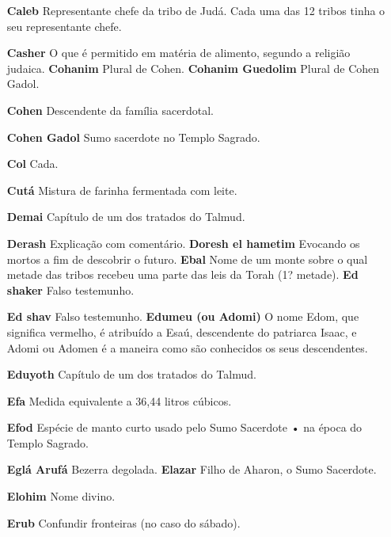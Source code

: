 \begin{itemize}
\item[\textbf{Caleb}] Representante chefe da tribo de Judá. Cada uma das 12
tribos tinha o seu representante chefe.

\item[\textbf{Casher}] O que é permitido em matéria de alimento, segundo a
religião judaica. \textbf{Cohanim} Plural de Cohen. \textbf{Cohanim
Guedolim} Plural de Co­hen Gadol.

\item[\textbf{Cohen}] Descendente da família sacer­dotal.

\item[\textbf{Cohen Gadol}] Sumo sacerdote no Templo Sagrado.

\item[\textbf{Col}] Cada.

\item[\textbf{Cutá}] Mistura de farinha fermentada com leite.

\item[\textbf{Demai}] Capítulo de um dos tratados do Talmud.

\item[\textbf{Derash}] Explicação com comentário. \textbf{Doresh el hametim} Evocando os mortos a fim de descobrir o futuro. \textbf{Ebal} Nome
de um monte sobre o qual metade das tribos recebeu uma parte das leis da
Torah (1? metade). \textbf{Ed shaker} Falso testemunho.

\item[\textbf{Ed shav} Falso testemunho. \textbf{Edumeu (ou Adomi)}] O nome
Edom, que significa vermelho, é atri­buído a Esaú, descendente do
patriar­ca Isaac, e Adomi ou Adomen é a ma­neira como são conhecidos os
seus descendentes.

\item[\textbf{Eduyoth}] Capítulo de um dos trata­dos do Talmud.

\item[\textbf{Efa}] Medida equivalente a 36,44 litros cúbicos.

\item[\textbf{Efod}] Espécie de manto curto usado pelo Sumo Sacerdote • na
época do Templo Sagrado.

\item[\textbf{Eglá Arufá} Bezerra degolada. \textbf{Elazar}] Filho de
Aharon, o Sumo Sa­cerdote.

\item[\textbf{Elohim}] Nome divino.

\item[\textbf{Erub}] Confundir fronteiras (no caso do sábado).


\end{itemize}
